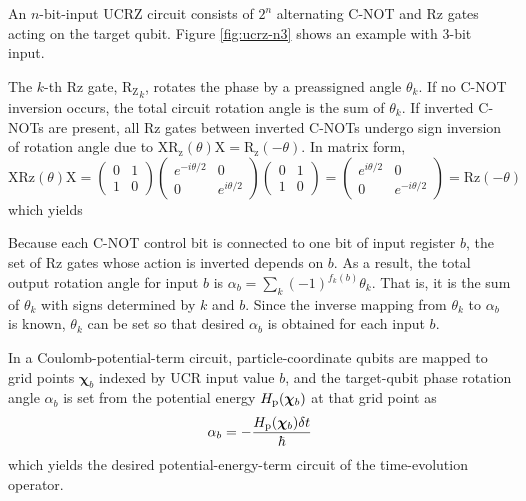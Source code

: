 \documentclass[a4paper,11pt]{article}
\begin{document}
An $n$-bit-input UCRZ circuit consists of $2^n$ alternating C-NOT and Rz gates
acting on the target qubit. Figure \ref{fig:ucrz-n3} shows an example with
3-bit input.

The $k$-th Rz gate, $\mathrm{R_Z}_k$, rotates the phase by a preassigned angle
$\theta_k$. If no C-NOT inversion occurs, the total circuit rotation angle is
the sum of $\theta_k$. If inverted C-NOTs are present, all Rz gates between
inverted C-NOTs undergo sign inversion of rotation angle due to
$\mathrm{XR_z}(\theta)\mathrm{X}=\mathrm{R_z}(-\theta)$. In matrix form,
\begin{equation}
    \mathrm{XRz}(\theta)\mathrm{X} = \begin{pmatrix}
        0 & 1 \\
        1 & 0
    \end{pmatrix}
    \begin{pmatrix}
        e^{-i\theta/2} & 0 \\
        0 & e^{i\theta/2}
    \end{pmatrix}
    \begin{pmatrix}
        0 & 1 \\
        1 & 0
    \end{pmatrix}
    = \begin{pmatrix}
        e^{i\theta/2} & 0 \\
        0 & e^{-i\theta/2}
    \end{pmatrix}
    = \mathrm{Rz}(-\theta)
\end{equation}
which yields

Because each C-NOT control bit is connected to one bit of input register $b$,
the set of Rz gates whose action is inverted depends on $b$. As a result, the
total output rotation angle for input $b$ is
$\alpha_b=\sum_{k}{(-1)^{f_k(b)}\theta_k}$. That is, it is the sum of
$\theta_k$ with signs determined by $k$ and $b$. Since the inverse mapping from
$\theta_k$ to $\alpha_b$ is known, $\theta_k$ can be set so that desired
$\alpha_b$ is obtained for each input $b$.

In a Coulomb-potential-term circuit, particle-coordinate qubits are mapped to
grid points $\bm{\chi}_b$ indexed by UCR input value $b$, and the target-qubit
phase rotation angle $\alpha_b$ is set from the potential energy
$H_{\mathrm{p}}(\bm{\chi}_b)$ at that grid point as
\begin{equation}
\alpha_b = -\frac{H_{\mathrm{p}}(\bm{\chi}_b)\delta t}{\hbar}
\end{equation}
which yields the desired potential-energy-term circuit of the time-evolution
operator.
\end{document}
